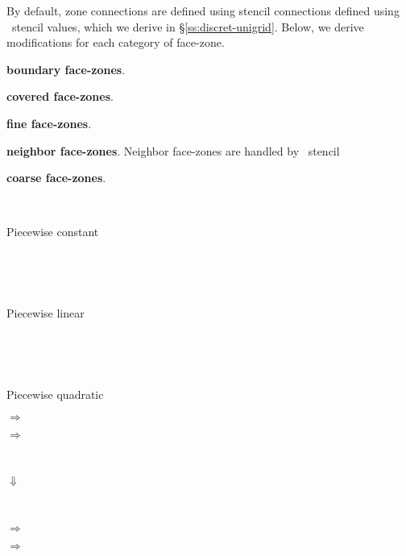 \documentclass[10pt]{article}
\begin{document}
By default, zone connections are defined using stencil connections defined
using \hypre\ stencil values, which we derive in \S\ref{ss:discret-unigrid}.
Below, we derive modifications for each category of face-zone.

\textbf{boundary face-zones}.

\textbf{covered face-zones}.


\textbf{fine face-zones}.

\textbf{neighbor face-zones}.  Neighbor face-zones are handled by \hypre\ stencil


\textbf{coarse face-zones}.



\begin{center}
\begin{minipage}{1.25in}
 \\
\centerline{Piecewise constant}
\end{minipage} \ \ \ 
\begin{minipage}{1.25in}
 \\
\centerline{Piecewise linear}
\end{minipage} \ \ \ 
\begin{minipage}{1.25in}
 \\
\centerline{Piecewise quadratic}
\end{minipage}
\end{center}



\begin{center}
\begin{minipage}{2in}
\end{minipage}$\Rightarrow$
\begin{minipage}{2in}
\end{minipage}$\Rightarrow$
\begin{minipage}{2in}
\end{minipage} \\
\begin{minipage}{4.5in}
\hfill $\Downarrow$
\end{minipage} \\
\begin{minipage}{2in}
\end{minipage}$\Rightarrow$
\begin{minipage}{2in}
\end{minipage}$\Rightarrow$
\begin{minipage}{2in}
\end{minipage}
\end{center}
\end{document}
